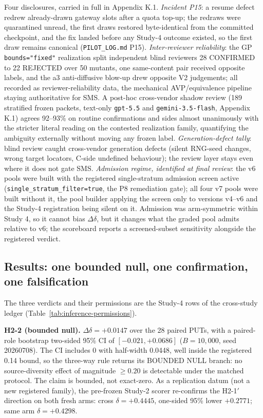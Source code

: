 \documentclass[manuscript,screen,review]{acmart}
\begin{document}
Four disclosures, carried in full in Appendix K.1. \emph{Incident P15}: a
resume defect redrew already-drawn gateway slots after a quota top-up; the
redraws were quarantined unread, the first draws restored byte-identical from
the committed checkpoint, and the fix landed before any Study-4 outcome
existed, so the first draw remains canonical (\texttt{PILOT\_LOG.md} P15).
\emph{Inter-reviewer reliability}: the GP \texttt{bounds="fixed"} realization
split independent blind reviewers 28 CONFIRMED to 22 REJECTED over 50
mutants, one same-content pair received opposite labels, and the a3
anti-diffusive blow-up drew opposite V2 judgements; all recorded as
reviewer-reliability data, the mechanical AVP/equivalence pipeline staying
authoritative for SMS. A post-hoc cross-vendor shadow review (189 stratified
frozen packets, text-only \texttt{gpt-5.5} and \texttt{gemini-3.5-flash},
Appendix K.1) agrees 92--93\% on routine confirmations and sides almost
unanimously with the stricter literal reading on the contested realization
family, quantifying the ambiguity externally without moving any frozen
label. \emph{Generation-defect tally}: blind review caught
cross-vendor generation defects (silent RNG-seed changes, wrong target
locators, C-side undefined behaviour); the review layer stays even where it
does not gate SMS. \emph{Admission regime, identified at final review}: the
v6 pools were built with the registered single-stratum admission screen
active (\texttt{single\_stratum\_filter=true}, the P8 remediation gate); all
four v7 pools were built without it, the pool builder applying the screen
only to versions v4--v6 and the Study-4 registration being silent on it.
Admission was arm-symmetric within Study 4, so it cannot bias
\(\Delta\delta\), but it changes what the graded pool admits relative to v6;
the scoreboard reports a screened-subset sensitivity alongside the registered
verdict.

\subsection{Results: one bounded null, one confirmation, one falsification}\label{study4-scoreboard}

The three verdicts and their permissions are the Study-4 rows of the
cross-study ledger (Table~\ref{tab:inference-permissions}).

\textbf{H2-2 (bounded null).} \(\Delta\delta = +0.0147\) over the 28 paired
PUTs, with a paired-role bootstrap two-sided 95\% CI of \([-0.021, +0.0686]\)
(\(B = 10{,}000\), seed 20260708). The CI includes 0 with half-width 0.0448,
well inside the registered 0.14 bound, so the three-way rule returns its
BOUNDED NULL branch: no source-diversity effect of magnitude \(\geq 0.20\) is
detectable under the matched protocol. The claim is bounded, not exact-zero.
As a replication datum (not a new registered family), the pre-frozen Study-2
scorer re-confirms the H2-1\('\) direction on both fresh arms: cross
\(\delta = +0.4445\), one-sided 95\% lower \(+0.2771\); same arm
\(\delta = +0.4298\).
\end{document}
